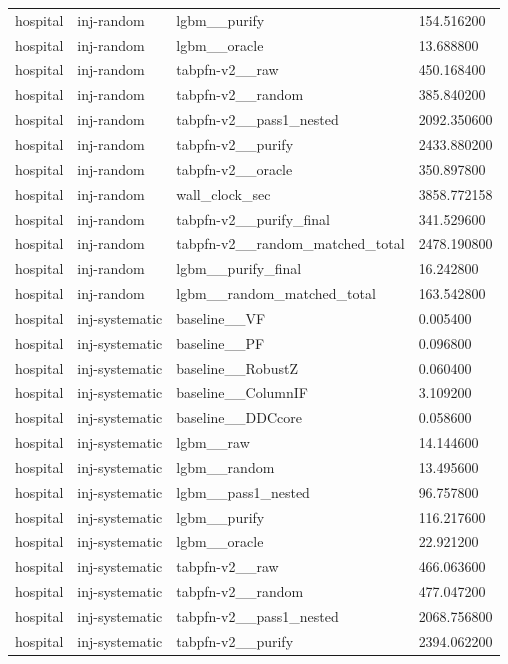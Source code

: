 \begin{tabular}{llll}
hospital & inj-random & lgbm\_\_purify & 154.516200 \\
hospital & inj-random & lgbm\_\_oracle & 13.688800 \\
hospital & inj-random & tabpfn-v2\_\_raw & 450.168400 \\
hospital & inj-random & tabpfn-v2\_\_random & 385.840200 \\
hospital & inj-random & tabpfn-v2\_\_pass1\_nested & 2092.350600 \\
hospital & inj-random & tabpfn-v2\_\_purify & 2433.880200 \\
hospital & inj-random & tabpfn-v2\_\_oracle & 350.897800 \\
hospital & inj-random & wall\_clock\_sec & 3858.772158 \\
hospital & inj-random & tabpfn-v2\_\_purify\_final & 341.529600 \\
hospital & inj-random & tabpfn-v2\_\_random\_matched\_total & 2478.190800 \\
hospital & inj-random & lgbm\_\_purify\_final & 16.242800 \\
hospital & inj-random & lgbm\_\_random\_matched\_total & 163.542800 \\
hospital & inj-systematic & baseline\_\_VF & 0.005400 \\
hospital & inj-systematic & baseline\_\_PF & 0.096800 \\
hospital & inj-systematic & baseline\_\_RobustZ & 0.060400 \\
hospital & inj-systematic & baseline\_\_ColumnIF & 3.109200 \\
hospital & inj-systematic & baseline\_\_DDCcore & 0.058600 \\
hospital & inj-systematic & lgbm\_\_raw & 14.144600 \\
hospital & inj-systematic & lgbm\_\_random & 13.495600 \\
hospital & inj-systematic & lgbm\_\_pass1\_nested & 96.757800 \\
hospital & inj-systematic & lgbm\_\_purify & 116.217600 \\
hospital & inj-systematic & lgbm\_\_oracle & 22.921200 \\
hospital & inj-systematic & tabpfn-v2\_\_raw & 466.063600 \\
hospital & inj-systematic & tabpfn-v2\_\_random & 477.047200 \\
hospital & inj-systematic & tabpfn-v2\_\_pass1\_nested & 2068.756800 \\
hospital & inj-systematic & tabpfn-v2\_\_purify & 2394.062200 \\

\end{tabular}
